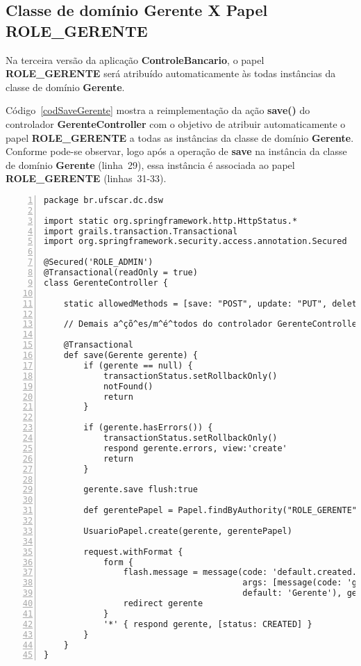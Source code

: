 \subsection{Classe de domínio Gerente X Papel {\bf ROLE\_GERENTE}}

\vspace{0.5cm}

Na  terceira   versão  da  aplicação   {\bf  ControleBancario},  o   papel  {\bf
  ROLE\_GERENTE} será atribuído automaticamente às todas instâncias da classe de
domínio {\bf Gerente}.  

\vspace{0.2cm}

Código~\ref{codSaveGerente}  mostra a  reimplementação da  ação {\bf  save()} do
controlador {\bf GerenteController} com o objetivo de atribuir automaticamente o 
papel  {\bf ROLE\_GERENTE}  a  todas as  instâncias  da classe  de domínio  {\bf
  Gerente}. Conforme  pode-se observar,  logo após a  operação de {\bf  save} na
instância  da classe  de  domínio  {\bf Gerente}  (linha~29),  essa instância  é
associada ao papel {\bf ROLE\_GERENTE} (linhas~31-33). 

\begin{lstlisting}[numbers=left,  caption=Controlador {\bf  Gerente}  (ação {\bf
      save()}), frame=trBL, float=htbp, label=codSaveGerente] 
package br.ufscar.dc.dsw

import static org.springframework.http.HttpStatus.*
import grails.transaction.Transactional
import org.springframework.security.access.annotation.Secured

@Secured('ROLE_ADMIN')
@Transactional(readOnly = true)
class GerenteController {

    static allowedMethods = [save: "POST", update: "PUT", delete: "DELETE"]

    // Demais a^çõ^es/m^é^todos do controlador GerenteController

    @Transactional
    def save(Gerente gerente) {
        if (gerente == null) {
            transactionStatus.setRollbackOnly()
            notFound()
            return
        }

        if (gerente.hasErrors()) {
            transactionStatus.setRollbackOnly()
            respond gerente.errors, view:'create'
            return
        }

        gerente.save flush:true

        def gerentePapel = Papel.findByAuthority("ROLE_GERENTE")
        
        UsuarioPapel.create(gerente, gerentePapel)
        
        request.withFormat {
            form {
                flash.message = message(code: 'default.created.message', 
                                        args: [message(code: 'gerente.label', 
                                        default: 'Gerente'), gerente.id])
                redirect gerente
            }
            '*' { respond gerente, [status: CREATED] }
        }
    }
}
\end{lstlisting}

